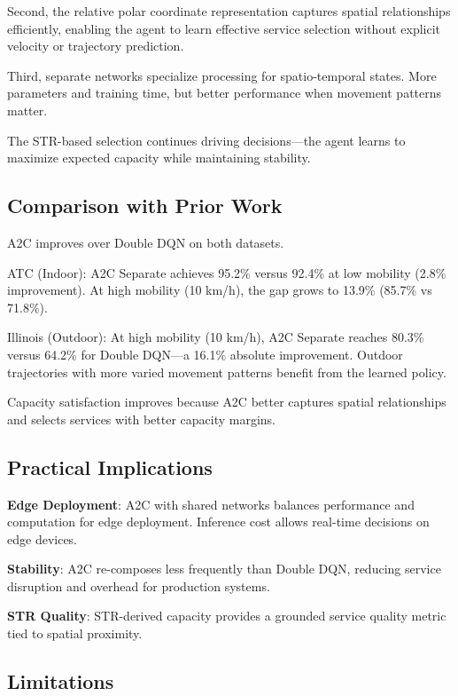 \documentclass[10pt,twocolumn]{article}
\begin{document}
Second, the relative polar coordinate representation captures spatial
relationships efficiently, enabling the agent to learn effective service
selection without explicit velocity or trajectory prediction.

Third, separate networks specialize processing for spatio-temporal
states. More parameters and training time, but better performance when
movement patterns matter.

The STR-based selection continues driving decisions---the agent learns
to maximize expected capacity while maintaining stability.

\subsection{Comparison with Prior Work}\label{comparison-with-prior-work}

A2C improves over Double DQN on both datasets.

ATC (Indoor): A2C Separate achieves 95.2\% versus 92.4\% at low
mobility (2.8\% improvement). At high mobility (10 km/h), the gap grows
to 13.9\% (85.7\% vs 71.8\%).

Illinois (Outdoor): At high mobility (10 km/h), A2C Separate reaches
80.3\% versus 64.2\% for Double DQN---a 16.1\% absolute improvement.
Outdoor trajectories with more varied movement patterns benefit from
the learned policy.

Capacity satisfaction improves because A2C better captures spatial
relationships and selects services with better capacity margins.

\subsection{Practical Implications}\label{practical-implications}

\textbf{Edge Deployment}: A2C with shared networks balances performance
and computation for edge deployment. Inference cost allows real-time
decisions on edge devices.

\textbf{Stability}: A2C re-composes less frequently than Double DQN,
reducing service disruption and overhead for production systems.

\textbf{STR Quality}: STR-derived capacity provides a grounded service
quality metric tied to spatial proximity.

\subsection{Limitations}\label{limitations}
\end{document}
